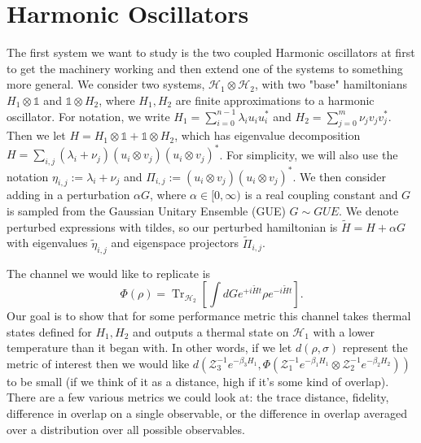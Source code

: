 \documentclass{article}
\newcommand{\parens}[1]{\left( #1 \right)}
\newcommand{\brackets}[1]{\left[ #1 \right]}
\newcommand{\openone}{\mathds{1}}
\DeclareMathOperator{\Tr}{Tr}
\newcommand{\partrace}[2]{\Tr_{#1} \brackets{ #2 }}
\newcommand{\hilb}{\mathscr{H}}
\newcommand{\partfun}{\mathcal{Z}}
\begin{document}
\section{Harmonic Oscillators}
The first system we want to study is the two coupled Harmonic oscillators at first to get the machinery working and then extend one of the systems to something more general. We consider two systems, $\hilb_1 \otimes \hilb_2$, with two "base" hamiltonians $H_1 \otimes \openone$ and $\openone \otimes H_2$, where $H_1, H_2$ are finite approximations to a harmonic oscillator. For notation, we write $H_1 = \sum_{i = 0}^{n-1} \lambda_i u_i u_i^*$ and $H_2 = \sum_{j = 0}^{m} \nu_j v_j v_j^*$. Then we let $H = H_1 \otimes \openone + \openone \otimes H_2$, which has eigenvalue decomposition $H = \sum_{i,j} (\lambda_i + \nu_j) (u_i \otimes v_j)(u_i \otimes v_j)^*$. For simplicity, we will also use the notation $\eta_{i,j} := \lambda_i + \nu_j$ and $\Pi_{i,j} := (u_i \otimes v_j) (u_i \otimes v_j)^*$. We then consider adding in a perturbation $\alpha G$, where $\alpha \in [0, \infty)$ is a real coupling constant and $G$ is sampled from the Gaussian Unitary Ensemble (GUE) $G \sim GUE$. We denote perturbed expressions with tildes, so our perturbed hamiltonian is $\widetilde{H} = H + \alpha G$ with eigenvalues $\widetilde{\eta}_{i,j}$ and eigenspace projectors $\widetilde{\Pi}_{i,j}$. 

The channel we would like to replicate is
\begin{equation}
    \Phi(\rho) = \partrace{\hilb_2}{\int dG e^{+i \widetilde{H} t} \rho e^{- i \widetilde{H} t}}.
\end{equation}
Our goal is to show that for some performance metric this channel takes thermal states defined for $H_1, H_2$ and outputs a thermal state on $\hilb_1$ with a lower temperature than it began with. In other words, if we let $d(\rho, \sigma)$ represent the metric of interest then we would like $d \parens{ \partfun_3^{-1} e^{-\beta_3 H_1}, \Phi\parens{\partfun_1^{-1} e^{-\beta_1 H_1} \otimes \partfun_2^{-1}e^{-\beta_2 H_2}} }$ to be small (if we think of it as a distance, high if it's some kind of overlap). There are a few various metrics we could look at: the trace distance, fidelity, difference in overlap on a single observable, or the difference in overlap averaged over a distribution over all possible observables. 
\end{document}
